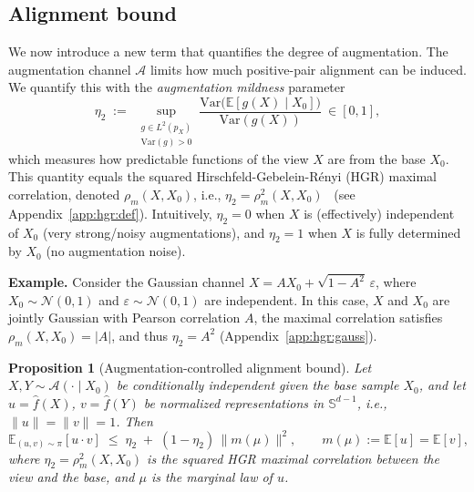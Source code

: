 \documentclass{article}
\newtheorem{proposition}{Proposition}
\newcommand{\E}{\mathbb{E}}
\newcommand{\Var}{\mathrm{Var}}
\newcommand{\Sph}{\mathbb{S}}
\begin{document}
\subsection{Alignment bound}
\label{sec:align_bound}
We now introduce a new term that quantifies the degree of augmentation.
The augmentation channel $\mathcal A$ limits how much positive-pair alignment can be induced.  
We quantify this with the \emph{augmentation mildness} parameter
\begin{equation}
\label{eq:eta2}
\eta_2
\;:=\;
\sup_{\substack{g\in L^2(p_X)\\ \Var(g)>0}}
\frac{\Var\big(\E[g(X)\mid X_0]\big)}{\Var(g(X))}
\ \in[0,1],
\end{equation}
which measures how predictable functions of the view $X$ are from the base $X_0$. 
% 
This quantity equals the squared Hirschfeld-Gebelein-Rényi (HGR) maximal correlation, denoted $\rho_m(X,X_0)$, i.e., $\eta_2=\rho_m^2(X,X_0)$~\citep{hirschfeld1935connection,gebelein1941statistische,renyi1959measures} (see Appendix~\ref{app:hgr:def}). Intuitively, \( \eta_2 = 0 \) when \( X \) is (effectively) independent of \( X_0 \) (very strong/noisy augmentations), and $\eta_2=1$ when $X$ is fully determined by $X_0$ (no augmentation noise).

\textbf{Example.}
Consider the Gaussian channel
\( X = A X_0 + \sqrt{1 - A^2}\,\varepsilon \),
where \( X_0 \sim \mathcal N(0,1) \) and \( \varepsilon \sim \mathcal N(0,1) \) are independent.
In this case, $X$ and $X_0$ are jointly Gaussian with Pearson correlation $A$, the maximal correlation satisfies $\rho_m(X,X_0)=|A|$, and thus $\eta_2 = A^2$ (Appendix~\ref{app:hgr:gauss}).

\begin{proposition}[Augmentation-controlled alignment bound]
\label{prop:alignment-bound}
Let \( X, Y \sim \mathcal A(\cdot \mid X_0) \) be conditionally independent given the base sample \( X_0 \), and let \( u = \hat f(X) \), \( v = \hat f(Y) \) be normalized representations in \( \Sph^{d-1} \), i.e., \( \|u\| = \|v\| = 1 \). Then
\begin{equation}
\label{eq:alignment_bound}
\E_{(u,v)\sim\pi}[u \cdot v]\;\le\;\eta_2\;+\;(1-\eta_2)\,\|m(\mu)\|^2,
\qquad
m(\mu) := \E[u] = \E[v],
\end{equation}
where \( \eta_2 = \rho_m^2(X, X_0) \) is the squared HGR maximal correlation between the view and the base, and \( \mu \) is the marginal law of \( u \). 
\end{proposition}
\end{document}
